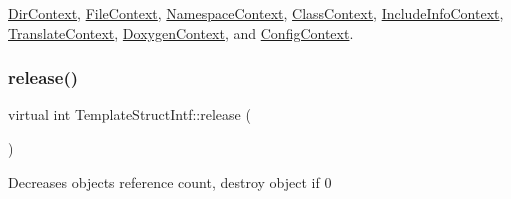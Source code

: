 \mbox{\hyperlink{class_dir_context_a3387722406ca015b5dabe220dfbed4b6}{Dir\+Context}}, \mbox{\hyperlink{class_file_context_a75e1e5c1d07c7d5b19e798fae742395e}{File\+Context}}, \mbox{\hyperlink{class_namespace_context_a0747424a5685c3adc549eb331be363c1}{Namespace\+Context}}, \mbox{\hyperlink{class_class_context_a7826818c79646d8fcdadfcab5f1c2cc5}{Class\+Context}}, \mbox{\hyperlink{class_include_info_context_a16525103c9f37d8749b49211ae51e6e1}{Include\+Info\+Context}}, \mbox{\hyperlink{class_translate_context_ab0fad4b75cd53cb3c22e8e1adee1c260}{Translate\+Context}}, \mbox{\hyperlink{class_doxygen_context_ad445e6fcda58749dc680b223b7e5ea2a}{Doxygen\+Context}}, and \mbox{\hyperlink{class_config_context_aa961d7f2814f0160b8eb3ddc52c18ddd}{Config\+Context}}.

\mbox{\label{class_template_struct_intf_a3dce7dd29d3f66a8080b40578e8a5045}} 
\subsubsection{\texorpdfstring{release()}{release()}}
{\footnotesize\ttfamily virtual int Template\+Struct\+Intf\+::release (\begin{DoxyParamCaption}{ }\end{DoxyParamCaption})\hspace{0.3cm}{\ttfamily [pure virtual]}}

Decreases object\textquotesingle{}s reference count, destroy object if 0 

